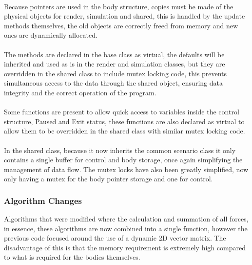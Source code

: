 {\paragraph{}
Because pointers are used in the body structure, copies must be made of the physical objects for render, simulation and shared, this is handled by the update methods themselves, the old objects are correctly freed from memory and new ones are dynamically allocated.

\paragraph{}
The methods are declared in the base class as virtual, the defaults will be inherited and used as is in the render and simulation classes, but they are overridden in the shared class to include mutex locking code, this prevents simultaneous access to the data through the shared object, ensuring data integrity and the correct operation of the program.

\paragraph{}
Some functions are present to allow quick access to variables inside the control structure, Paused and Exit status, these functions are also declared as virtual to allow them to be overridden in the shared class with similar mutex locking code.

\paragraph{}
In the shared class, because it now inherits the common scenario class it only contains a single buffer for control and body storage, once again simplifying the management of data flow. The mutex locks have also been greatly simplified, now only having a mutex for the body pointer storage and one for control.

\subsubsection{Algorithm Changes}
Algorithms that were modified where the calculation and summation of all forces, in essence, these algorithms are now combined into a single function, however the previous code focused around the use of a dynamic 2D vector matrix. The disadvantage of this is that the memory requirement is extremely high compared to what is required for the bodies themselves. 

}

